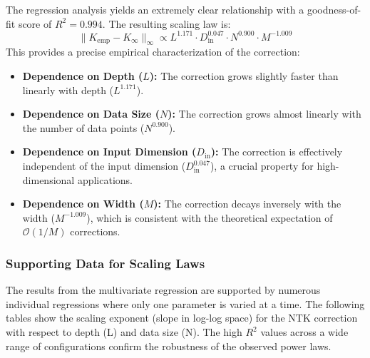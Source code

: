 \documentclass{article}
\begin{document}
The regression analysis yields an extremely clear relationship with a goodness-of-fit score of $R^2 = 0.994$. The resulting scaling law is:
\begin{equation}
    \|K_{\text{emp}} - K_{\infty}\|_\infty \propto L^{1.171} \cdot D_{\text{in}}^{0.047} \cdot N^{0.900} \cdot M^{-1.009}
    \label{eq:scaling_law}
\end{equation}
This provides a precise empirical characterization of the correction:
\begin{itemize}
    \item \textbf{Dependence on Depth ($L$):} The correction grows slightly faster than linearly with depth ($L^{1.171}$).
    \item \textbf{Dependence on Data Size ($N$):} The correction grows almost linearly with the number of data points ($N^{0.900}$).
    \item \textbf{Dependence on Input Dimension ($D_{\text{in}}$):} The correction is effectively independent of the input dimension ($D_{\text{in}}^{0.047}$), a crucial property for high-dimensional applications.
    \item \textbf{Dependence on Width ($M$):} The correction decays inversely with the width ($M^{-1.009}$), which is consistent with the theoretical expectation of $\mathcal{O}(1/M)$ corrections.
\end{itemize}

\subsubsection{Supporting Data for Scaling Laws}

The results from the multivariate regression are supported by numerous individual regressions where only one parameter is varied at a time. The following tables show the scaling exponent (slope in log-log space) for the NTK correction with respect to depth (L) and data size (N). The high $R^2$ values across a wide range of configurations confirm the robustness of the observed power laws.
\end{document}
